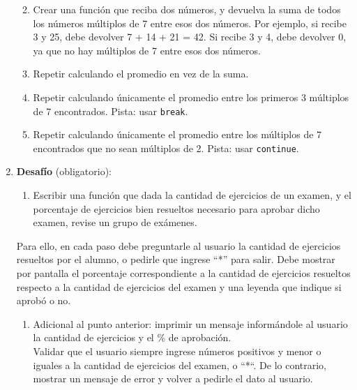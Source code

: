 \documentclass[
  letterpaper,
  DIV=11,
  numbers=noendperiod]{scrreprt}
\providecommand{\tightlist}{%
  \setlength{\itemsep}{0pt}\setlength{\parskip}{0pt}}\usepackage{longtable,booktabs,array}
\begin{document}
\begin{enumerate}
  \begin{enumerate}
  \def\labelenumii{\alph{enumii}.}
  \item
    Crear una función que reciba dos números, y devuelva la suma de
    todos los números múltiplos de 7 entre esos dos números. Por
    ejemplo, si recibe 3 y 25, debe devolver 7 + 14 + 21 = 42. Si recibe
    3 y 4, debe devolver 0, ya que no hay múltiplos de 7 entre esos dos
    números.
  \item
    Repetir calculando el promedio en vez de la suma.
  \item
    Repetir calculando únicamente el promedio entre los primeros 3
    múltiplos de 7 encontrados. Pista: usar \texttt{break}.
  \item
    Repetir calculando únicamente el promedio entre los múltiplos de 7
    encontrados que no sean múltiplos de 2. Pista: usar
    \texttt{continue}.
  \end{enumerate}
\item
  \textbf{Desafío} (obligatorio):

  \begin{enumerate}
  \def\labelenumii{\alph{enumii}.}
  \tightlist
  \item
    Escribir una función que dada la cantidad de ejercicios de un
    examen, y el porcentaje de ejercicios bien resueltos necesario para
    aprobar dicho examen, revise un grupo de exámenes.
  \end{enumerate}

  Para ello, en cada paso debe preguntarle al usuario la cantidad de
  ejercicios resueltos por el alumno, o pedirle que ingrese ``*'' para
  salir. Debe mostrar por pantalla el porcentaje correspondiente a la
  cantidad de ejercicios resueltos respecto a la cantidad de ejercicios
  del examen y una leyenda que indique si aprobó o no.

  \begin{enumerate}
  \def\labelenumii{\alph{enumii}.}
  \setcounter{enumii}{1}
  \tightlist
  \item
    Adicional al punto anterior: imprimir un mensaje informándole al
    usuario la cantidad de ejercicios y el \% de aprobación.\\
    Validar que el usuario siempre ingrese números positivos y menor o
    iguales a la cantidad de ejercicios del examen, o ``*``. De lo
    contrario, mostrar un mensaje de error y volver a pedirle el dato al
    usuario.
  \end{enumerate}
\end{enumerate}
\end{document}

